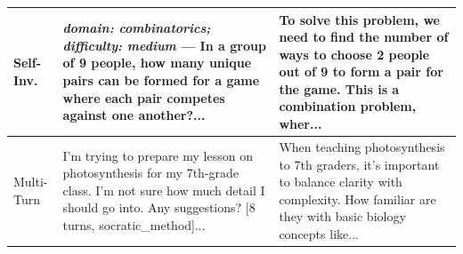 \begin{table}[t]
\begin{tabular}{p{1.8cm}p{5.5cm}p{6.5cm}}
\midrule
Self-Inv. & \textit{domain: combinatorics; difficulty: medium} --- In a group of 9 people, how many unique pairs can be formed for a game where each pair competes against one another?... & To solve this problem, we need to find the number of ways to choose 2 people out of 9 to form a pair for the game. This is a combination problem, wher... \\
\midrule
Multi-Turn & I'm trying to prepare my lesson on photosynthesis for my 7th-grade class. I'm not sure how much detail I should go into. Any suggestions? [8 turns, socratic\_method]... & When teaching photosynthesis to 7th graders, it's important to balance clarity with complexity. How familiar are they with basic biology concepts like... \\
\bottomrule
\end{tabular}
\end{table}